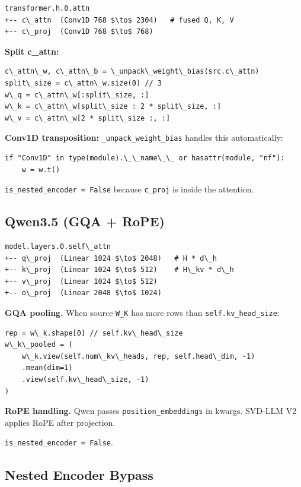 \begin{lstlisting}
transformer.h.0.attn
+-- c\_attn  (Conv1D 768 $\to$ 2304)   # fused Q, K, V
+-- c\_proj  (Conv1D 768 $\to$ 768)
\end{lstlisting}

\textbf{Split c\_attn:}

\begin{lstlisting}
c\_attn\_w, c\_attn\_b = \_unpack\_weight\_bias(src.c\_attn)
split\_size = c\_attn\_w.size(0) // 3
w\_q = c\_attn\_w[:split\_size, :]
w\_k = c\_attn\_w[split\_size : 2 * split\_size, :]
w\_v = c\_attn\_w[2 * split\_size :, :]
\end{lstlisting}

\textbf{Conv1D transposition:} \texttt{\_unpack\_weight\_bias} handles this automatically:

\begin{lstlisting}
if "Conv1D" in type(module).\_\_name\_\_ or hasattr(module, "nf"):
    w = w.t()
\end{lstlisting}

\texttt{is\_nested\_encoder = False} because \texttt{c\_proj} is inside the attention.

\subsection{Qwen3.5 (GQA + RoPE)}

\begin{lstlisting}
model.layers.0.self\_attn
+-- q\_proj  (Linear 1024 $\to$ 2048)   # H * d\_h
+-- k\_proj  (Linear 1024 $\to$ 512)    # H\_kv * d\_h
+-- v\_proj  (Linear 1024 $\to$ 512)
+-- o\_proj  (Linear 2048 $\to$ 1024)
\end{lstlisting}

\textbf{GQA pooling.} When source \texttt{W\_K} has more rows than \texttt{self.kv\_head\_size}:

\begin{lstlisting}
rep = w\_k.shape[0] // self.kv\_head\_size
w\_k\_pooled = (
    w\_k.view(self.num\_kv\_heads, rep, self.head\_dim, -1)
    .mean(dim=1)
    .view(self.kv\_head\_size, -1)
)
\end{lstlisting}

\textbf{RoPE handling.} Qwen passes \texttt{position\_embeddings} in kwargs. SVD-LLM V2 
applies RoPE after projection.

\texttt{is\_nested\_encoder = False}.

\subsection{Nested Encoder Bypass}

